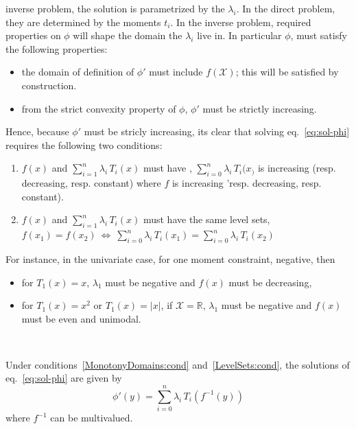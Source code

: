 \documentclass[english,sort&compress]{elsarticle}
\theoremstyle{definition}
\theoremstyle{plain}
\theoremstyle{plain}
\def\Rset{\mathbb{R}}
\def\X{\mathcal{X}}
\begin{document}
 inverse  problem, the solution is
parametrized by the  $\lambda_i$. In the direct problem,  they are determined by
the moments  $t_i$. In the inverse  problem, required properties  on $\phi$ will
shape the domain the $\lambda_i$ live in. In particular $\phi$, must satisfy the
following properties:
%
\begin{itemize}
\item the  domain of definition  of $\phi'$ must  include $f(\X)$; this  will be
  satisfied by construction.
%
\item from  the strict  convexity property of  $\phi$, $\phi'$ must  be strictly
  increasing.
\end{itemize}
%
Hence,  because $\phi'$  must  be  stricly increasing,  its  clear that  solving
eq.~\eqref{eq:sol-phi}  requires the following two conditions:
%
\begin{enumerate}[label=(C\arabic*)]
\item\label{MonotonyDomains:cond}   $f(x)$   and   $\displaystyle   \sum_{i=1}^n
  \lambda_i   \,  T_i(x)$  must   have  ,
  $\displaystyle    \sum_{i=0}^n   \lambda_i    \,   T_i(x_)$    is   increasing
  (resp. decreasing, resp. constant)  where $f$ is increasing 'resp. decreasing,
  resp. constant).
%
\item\label{LevelSets:cond} $f(x)$ and  $\displaystyle \sum_{i=1}^n \lambda_i \,
  T_i(x)$ must have the same level  sets, $f(x_1) = f(x_2) \: \Leftrightarrow \:
  \displaystyle \sum_{i=0}^n  \lambda_i \, T_i(x_1) =  \sum_{i=0}^n \lambda_i \,
  T_i(x_2)$
\end{enumerate}
%
For instance, in the univariate case, for one moment constraint, negative, then
%
\begin{itemize}
\item  for  $T_1(x) =  x$,  $\lambda_1$  must be  negative  and  $f(x)$ must  be
  decreasing,
%
\item for $T_1(x) = x^2$ or $T_1(x) = |x|$, if $\X = \Rset$, $\lambda_1$ must be
  negative and $f(x)$ must be even and unimodal.
\end{itemize}

\

Under  conditions~\ref{MonotonyDomains:cond} and~\ref{LevelSets:cond}, the
solutions of eq.~\eqref{eq:sol-phi} are given by
%
\begin{equation}\label{eq:derivative-phi}
\phi'(y) = \sum_{i=0}^n \lambda_i \, T_i\!\left(f^{-1}(y)\right)
\end{equation}
%
where $f^{-1}$ can be multivalued.
\end{document}
